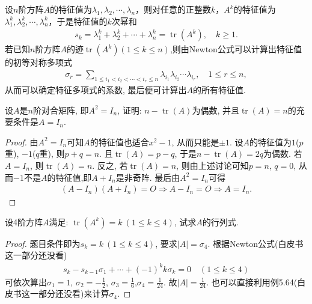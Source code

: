 \documentclass[../../main.tex]{subfiles}%
\begin{document}
\begin{conclusion}
设$n$阶方阵$A$的特征值为$\lambda_1, \lambda_2, \cdots, \lambda_n$，则对任意的正整数$k$，$A^k$的特征值为$\lambda_1^k, \lambda_2^k, \cdots, \lambda_n^k$，于是特征值的$k$次幂和
\begin{align*}
s_k = \lambda_1^k + \lambda_2^k + \cdots + \lambda_n^k = \operatorname{tr}(A^k), \quad k \geqslant  1.
\end{align*}
若已知$n$阶方阵$A$的迹$\operatorname{tr}(A^k)(1\leqslant  k \leqslant  n)$,则由Newton公式可以计算出特征值的初等对称多项式
\begin{align*}
\sigma_r = \sum_{1 \leqslant  i_1 < i_2 < \cdots < i_r \leqslant  n} \lambda_{i_1} \lambda_{i_2} \cdots \lambda_{i_r}, \quad 1 \leqslant  r \leqslant  n,
\end{align*}
从而可以确定特征多项式的系数, 最后便可计算出$A$的所有特征值.
\end{conclusion}

\begin{example}
设$A$是$n$阶对合矩阵, 即$A^2 = I_n$, 证明: $n - \operatorname{tr}(A)$为偶数, 并且$\operatorname{tr}(A) = n$的充要条件是$A = I_n$.
\end{example}
\begin{proof}

由$A^2 = I_n$可知$A$的特征值也适合$x^2 - 1$, 从而只能是$\pm 1$. 设$A$的特征值为$1$($p$重), $-1$($q$重), 则$p + q = n$. 且$\operatorname{tr}(A) = p - q$, 于是$n - \operatorname{tr}(A) = 2q$为偶数. 若$A = I_n$, 则$\operatorname{tr}(A) = n$. 反之, 若$\operatorname{tr}(A) = n$, 则由上述讨论可知$p = n$, $q = 0$, 从而$-1$不是$A$的特征值,即$A + I_n$是非奇阵. 最后由$A^2=I_n$可得
\begin{align*}
(A - I_n)(A + I_n) = O\Rightarrow A-I_n=O\Rightarrow A = I_n.
\end{align*}

\end{proof}

\begin{example}
设4阶方阵$A$满足: $\operatorname{tr}(A^k) = k \ (1 \leqslant  k \leqslant  4)$, 试求$A$的行列式.
\end{example}
\begin{proof}

题目条件即为$s_k = k \ (1 \leqslant  k \leqslant  4)$, 要求$\lvert A \rvert = \sigma_4$. 根据Newton公式(白皮书这一部分还没看)
\begin{align*}
s_k - s_{k-1} \sigma_1 + \cdots + (-1)^k k \sigma_k = 0 \quad (1 \leqslant  k \leqslant  4)
\end{align*}
可依次算出$\sigma_1 = 1$, $\sigma_2 = -\frac{1}{2}$, $\sigma_3 = \frac{1}{6}$,$\sigma_4 = \frac{1}{24}.$
故$\lvert A \rvert = \frac{1}{24}$. 也可以直接利用例5.64(白皮书这一部分还没看)来计算$\sigma_4$.

\end{proof}
\end{document}
